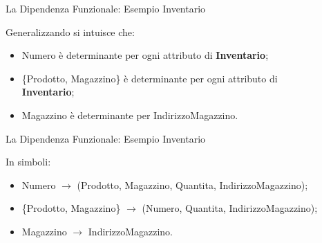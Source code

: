 %
\begin{frame}{La Dipendenza Funzionale: Esempio Inventario}
\vspace{-0.7cm}
\InventarioModified
\vspace{.2cm}

Generalizzando si intuisce che:
\begin{itemize}[<+->]
    \item Numero \`e determinante per ogni attributo di \textbf{Inventario};
    \item \{Prodotto, Magazzino\} \`e determinante per ogni attributo di\\ \textbf{Inventario};
    \item Magazzino \`e determinante per IndirizzoMagazzino.
\end{itemize}
\end{frame}
%
\begin{frame}{La Dipendenza Funzionale: Esempio Inventario}
\vspace{-0.7cm}
\InventarioModified
\vspace{.2cm}

In simboli:
\begin{itemize}[<+->]
    \item Numero $ \rightarrow $ (Prodotto, Magazzino, Quantita, IndirizzoMagazzino);
    \item {\small \{Prodotto, Magazzino\} $ \rightarrow $ (Numero, Quantita, IndirizzoMagazzino);}
    \item Magazzino $ \rightarrow $ IndirizzoMagazzino.
\end{itemize}
\end{frame}

